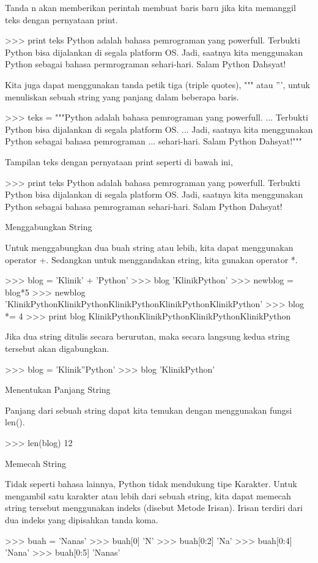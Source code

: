 Tanda n akan memberikan perintah membuat baris baru jika kita memanggil teks dengan pernyataan print.

>>> print teks
Python adalah bahasa pemrograman yang powerfull.
Terbukti Python bisa dijalankan di segala platform OS.
Jadi, saatnya kita menggunakan Python sebagai bahasa permrograman
sehari-hari. Salam Python Dahsyat!

Kita juga dapat menggunakan tanda petik tiga (triple quotes), """ atau ''', untuk menuliskan sebuah string yang panjang dalam beberapa baris.

>>> teks = """Python adalah bahasa pemrograman yang powerfull.
... Terbukti Python bisa dijalankan di segala platform OS.
... Jadi, saatnya kita menggunakan Python sebagai bahasa pemrograman
... sehari-hari. Salam Python Dahsyat!"""

Tampilan teks dengan pernyataan print seperti di bawah ini,

>>> print teks
Python adalah bahasa pemrograman yang powerfull.
Terbukti Python bisa dijalankan di segala platform OS.
Jadi, saatnya kita menggunakan Python sebagai bahasa pemrograman
sehari-hari. Salam Python Dahsyat!

Menggabungkan String

Untuk menggabungkan dua buah string atau lebih, kita dapat menggunakan operator +. Sedangkan untuk menggandakan string, kita gunakan operator *.

>>> blog = 'Klinik' + 'Python'
>>> blog
'KlinikPython'
>>> newblog = blog*5
>>> newblog
'KlinikPythonKlinikPythonKlinikPythonKlinikPythonKlinikPython'
>>> blog *= 4
>>> print blog
KlinikPythonKlinikPythonKlinikPythonKlinikPython

Jika dua string ditulis secara berurutan, maka secara langsung kedua string tersebut akan digabungkan.

>>> blog = 'Klinik''Python'
>>> blog
'KlinikPython'

Menentukan Panjang String

Panjang dari sebuah string dapat kita temukan dengan menggunakan fungsi len().

>>> len(blog)
12

Memecah String

Tidak seperti bahasa lainnya, Python tidak mendukung tipe Karakter. Untuk mengambil satu karakter atau lebih dari sebuah string, kita dapat memecah string tersebut menggunakan indeks (disebut Metode Irisan). Irisan terdiri dari dua indeks yang dipisahkan tanda koma.

>>> buah = 'Nanas'
>>> buah[0]
'N'
>>> buah[0:2]
'Na'
>>> buah[0:4]
'Nana'
>>> buah[0:5]
'Nanas'

